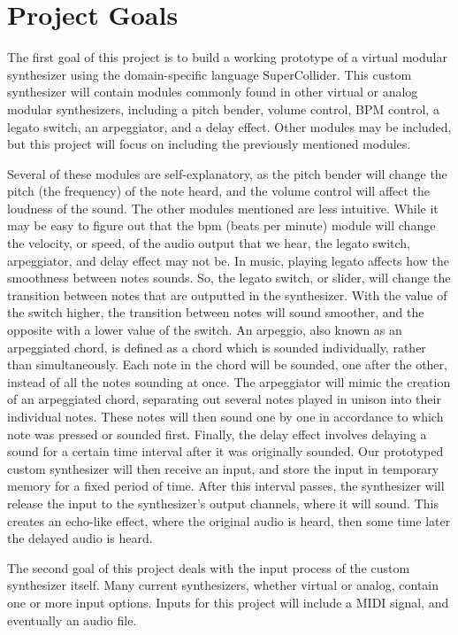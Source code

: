 \section[Project Goals]{Project Goals}\label{section:project-goals}
The first goal of this project is to build a working prototype of a virtual modular synthesizer using the domain-specific language SuperCollider. This custom synthesizer will contain modules commonly found in other virtual or analog modular synthesizers, including a pitch bender, volume control, BPM control, a legato switch, an arpeggiator, and a delay effect. Other modules may be included, but this project will focus on including the previously mentioned modules. 

Several of these modules are self-explanatory, as the pitch bender will change the pitch (the frequency) of the note heard, and the volume control will affect the loudness of the sound. The other modules mentioned are less intuitive. While it may be easy to figure out that the bpm (beats per minute) module will change the velocity, or speed, of the audio output that we hear, the legato switch, arpeggiator, and delay effect may not be. In music, playing legato affects how the smoothness between notes sounds. So, the legato switch, or slider, will change the transition between notes that are outputted in the synthesizer. With the value of the switch higher, the transition between notes will sound smoother, and the opposite with a lower value of the switch. An arpeggio, also known as an arpeggiated chord, is defined as a chord which is sounded individually, rather than simultaneously. Each note in the chord will be sounded, one after the other, instead of all the notes sounding at once. The arpeggiator will mimic the creation of an arpeggiated chord, separating out several notes played in unison into their individual notes. These notes will then sound one by one in accordance to which note was pressed or sounded first. Finally, the delay effect involves delaying a sound for a certain time interval after it was originally sounded. Our prototyped custom synthesizer will then receive an input, and store the input in temporary memory for a fixed period of time. After this interval passes, the synthesizer will release the input to the synthesizer's output channels, where it will sound. This creates an echo-like effect, where the original audio is heard, then some time later the delayed audio is heard. 

The second goal of this project deals with the input process of the custom synthesizer itself. Many current synthesizers, whether virtual or analog, contain one or more input options. Inputs for this project will include a MIDI signal, and eventually an audio file. 